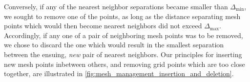 Conversely, if any of the nearest neighbor separations became smaller than
$\Delta_{\min}$, we sought to remove one of the points, as long as the
distance separating mesh points which would then become nearest neighbors
did not exceed $\Delta_{\max}$. Accordingly, if any one of a pair of
neighboring mesh points was to be removed, we chose to discard the one which
would result in the smallest separation between the ensuing, \emph{new} pair of
nearest neighbors. Our principles for inserting new mesh points inbetween
others, and removing grid points which are too close together, are illustrated
in \cref{fig:mesh_management_insertion_and_deletion}.


